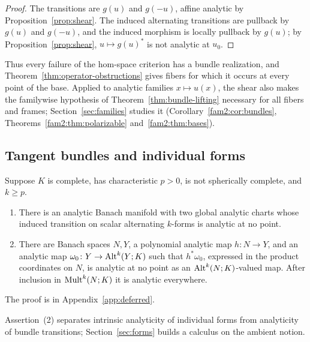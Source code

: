 \begin{proof}
The transitions are $g(u)$ and $g(-u)$, affine analytic by Proposition~\ref{prop:shear}. The induced alternating transitions are pullback by $g(u)$ and $g(-u)$, and the induced morphism is locally pullback by $g(u)$; by Proposition~\ref{prop:shear}, $u\mapsto g(u)^*$ is not analytic at $u_0$.
\end{proof}

Thus every failure of the hom-space criterion has a bundle realization, and Theorem~\ref{thm:operator-obstructions} gives fibers for which it occurs at every point of the base. Applied to analytic families $x\mapsto u(x)$, the shear also makes the familywise hypothesis of Theorem~\ref{thm:bundle-lifting} necessary for all fibers and frames; Section~\ref{sec:families} studies it (Corollary~\ref{fam2:cor:bundles}, Theorems~\ref{fam2:thm:polarizable} and~\ref{fam2:thm:bases}).

\subsection{Tangent bundles and individual forms}

\begin{proposition}\label{prop:tangent-obstruction}
Suppose $K$ is complete, has characteristic $p>0$, is not spherically complete, and $k\ge p$.
\begin{enumerate}
\item There is an analytic Banach manifold with two global analytic charts whose induced transition on scalar alternating $k$\nobreakdash-forms is analytic at no point.
\item There are Banach spaces $N,Y$, a polynomial analytic map $h\colon N\to Y$, and an analytic map $\omega_0\colon Y\to\operatorname{Alt}^k(Y;K)$ such that $h^*\omega_0$, expressed in the product coordinates on $N$, is analytic at no point as an $\operatorname{Alt}^k(N;K)$\nobreakdash-valued map. After inclusion in $\operatorname{Mult}^k(N;K)$ it is analytic everywhere.
\end{enumerate}
\end{proposition}

The proof is in Appendix~\ref{app:deferred}.

Assertion~(2) separates intrinsic analyticity of individual forms from analyticity of bundle transitions; Section~\ref{sec:forms} builds a calculus on the ambient notion.

